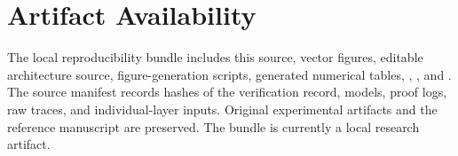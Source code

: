 \documentclass[conference]{IEEEtran}
\begin{document}
\section*{Artifact Availability}
The local reproducibility bundle includes this source, vector figures, editable architecture source, figure-generation scripts, generated numerical tables, , , and . The source manifest records hashes of the verification record, models, proof logs, raw traces, and individual-layer inputs. Original experimental artifacts and the reference manuscript are preserved. The bundle is currently a local research artifact.



\end{document}
